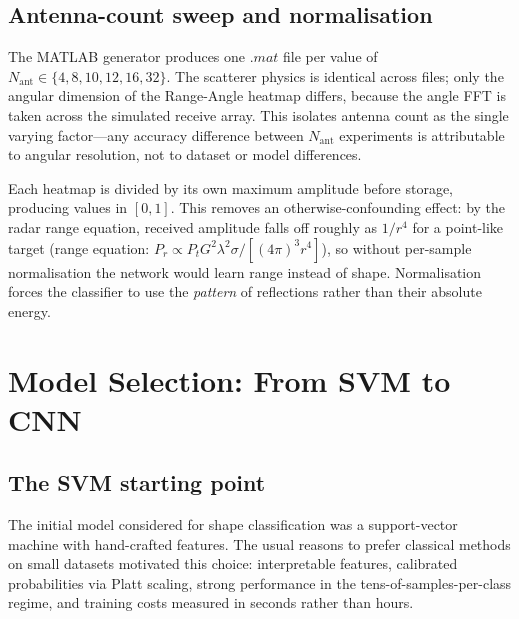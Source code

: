 \documentclass[letterpaper,11pt,leqno]{article}
\begin{document}
\subsection{Antenna-count sweep and normalisation}

The MATLAB generator produces one $.mat$ file per value of $N_{\mathrm{ant}}\in\{4,8,10,12,16,32\}$. The scatterer physics is identical across files; only the angular dimension of the Range-Angle heatmap differs, because the angle FFT is taken across the simulated receive array. This isolates antenna count as the single varying factor---any accuracy difference between $N_{\mathrm{ant}}$ experiments is attributable to angular resolution, not to dataset or model differences.

Each heatmap is divided by its own maximum amplitude before storage, producing values in $[0,1]$. This removes an otherwise-confounding effect: by the radar range equation, received amplitude falls off roughly as $1/r^4$ for a point-like target (range equation: $P_r \propto P_t G^2 \lambda^2 \sigma / [(4\pi)^3 r^4]$), so without per-sample normalisation the network would learn range instead of shape. Normalisation forces the classifier to use the \emph{pattern} of reflections rather than their absolute energy.

\section{Model Selection: From SVM to CNN}\label{s:model}

\subsection{The SVM starting point}

The initial model considered for shape classification was a support-vector machine \citep{Cortes95} with hand-crafted features. The usual reasons to prefer classical methods on small datasets motivated this choice: interpretable features, calibrated probabilities via Platt scaling, strong performance in the tens-of-samples-per-class regime, and training costs measured in seconds rather than hours.
\end{document}
